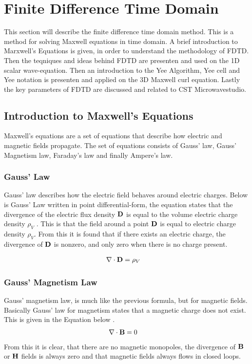\section{Finite Difference Time Domain}
\label{sec:fdtd}
This section will describe the finite difference time domain method. This is a method for solving Maxwell equations in time domain. A brief introduction to Marxwell's Equations is given, in order to understand the methodology of FDTD. Then the teqniques and ideas behind FDTD are presenten and used on the 1D scalar wave-equation. Then an introduction to the Yee Algorithm, Yee cell and Yee notation is presenten and applied on the 3D Maxwell curl equation. Lastly the key parameters of FDTD are discussed and related to CST Microwavestudio.

\subsection{Introduction to Maxwell's Equations}
Maxwell's equations are a set of equations that describe how electric and magnetic fields propagate. The set of equations consists of Gauss' law, Gauss' Magnetism law, Faraday's law and finally Ampere's law. 

\subsubsection{Gauss' Law}
Gauss' law describes how the electric field behaves around electric charges. Below is Gauss' Law written in point differential-form, the equation states that the divergence of the electric flux density $\bold{D}$ is equal to the volume electric charge density $\rho_V$ \cite{taflove2000computional}. This is that the field around a point $\bold{D}$ is equal to electric charge density $\rho_V$. From this it is found that if there exists an electric charge, the divergence of $\bold{D}$ is nonzero, and only zero when there is no charge present. 

\begin{align}
\nabla \cdot \bold{D} &= \rho_V
\end{align}

\subsubsection{Gauss' Magnetism Law}
Gauss' magnetism law, is much like the previous formula, but for magnetic fields. Basically Gauss' law for magnetism states that a magnetic charge does not exist. This is given in the Equation below \cite{taflove2000computional}. 
\begin{align}
\nabla \cdot \bold{B} &=0
\end{align}
From this it is clear, that there are no magnetic monopoles, the divergence of $\bold{B}$ or $\bold{H}$ fields is always zero and that magnetic fields always flows in closed loops. 


